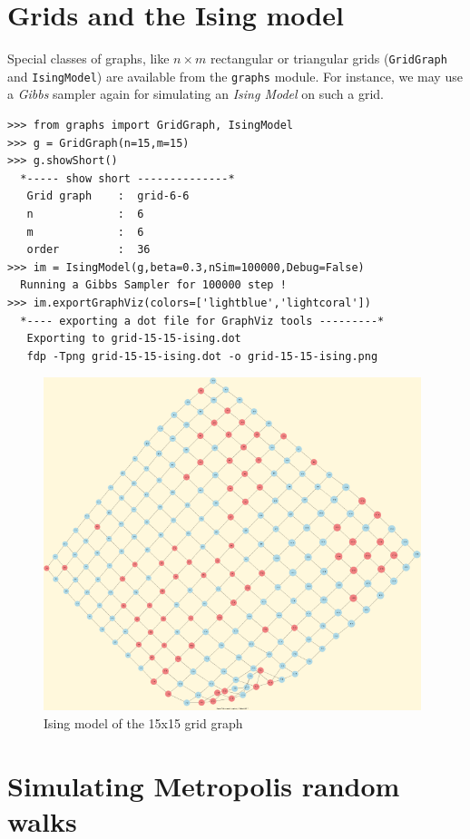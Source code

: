 \section{Grids and the Ising model}
\label{sec:21.5}

Special classes of graphs, like $n \times m$ rectangular or triangular grids (\texttt{GridGraph} and \texttt{IsingModel}) are available from the \texttt{graphs} module. For instance, we may use a \emph{Gibbs} sampler again for simulating an \emph{Ising Model} on such a grid.
\begin{lstlisting}
>>> from graphs import GridGraph, IsingModel
>>> g = GridGraph(n=15,m=15)
>>> g.showShort()
  *----- show short --------------*
   Grid graph    :  grid-6-6
   n             :  6
   m             :  6
   order         :  36
>>> im = IsingModel(g,beta=0.3,nSim=100000,Debug=False)
  Running a Gibbs Sampler for 100000 step !
>>> im.exportGraphViz(colors=['lightblue','lightcoral'])
  *---- exporting a dot file for GraphViz tools ---------*
   Exporting to grid-15-15-ising.dot
   fdp -Tpng grid-15-15-ising.dot -o grid-15-15-ising.png
\end{lstlisting}
\begin{figure}[h]
\sidecaption
\includegraphics[width=11cm]{Figures/grid-15-15-ising.png}
\caption{Ising model of the 15x15 grid graph} 
\label{fig:21.5}       %
\end{figure}

\section{Simulating Metropolis random walks}
\label{sec:21.6}

